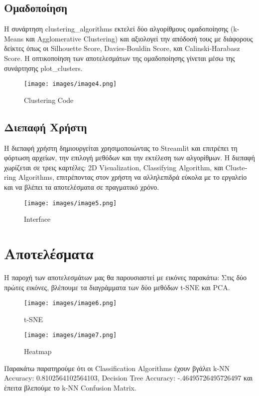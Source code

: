 \documentclass{article}
\begin{document}
\newpage\subsection{Ομαδοποίηση}
Η συνάρτηση \textlatin{clustering\_algorithms} εκτελεί δύο αλγορίθμους ομαδοποίησης (\textlatin{k-Means} και \textlatin{Agglomerative Clustering}) και αξιολογεί την απόδοσή τους με διάφορους δείκτες όπως οι \textlatin{Silhouette Score}, \textlatin{Davies-Bouldin Score}, και \textlatin{Calinski-Harabasz Score}. Η οπτικοποίηση των αποτελεσμάτων της ομαδοποίησης γίνεται μέσω της συνάρτησης \textlatin{plot\_clusters}.
\begin{figure}[h]
   \centering
   \texttt{[image: images/image4.png]}
   \caption{\textlatin{Clustering Code}}
   \label{fig:example}
\end{figure}

\newpage\subsection{Διεπαφή Χρήστη}
Η διεπαφή χρήστη δημιουργείται χρησιμοποιώντας το \textlatin{Streamlit} και επιτρέπει τη φόρτωση αρχείων, την επιλογή μεθόδων και την εκτέλεση των αλγορίθμων. Η διεπαφή χωρίζεται σε τρεις καρτέλες: \textlatin{2D Visualization}, \textlatin{Classifying Algorithm}, και \textlatin{Clustering Algorithms}, επιτρέποντας στον χρήστη να αλληλεπιδρά εύκολα με το εργαλείο και να βλέπει τα αποτελέσματα σε πραγματικό χρόνο.
\begin{figure}[h]
   \centering
   \texttt{[image: images/image5.png]}
   \caption{\textlatin{Interface}}
   \label{fig:example}
\end{figure}

\newpage\section{Αποτελέσματα}
Η παροχή των αποτελεσμάτων μας θα παρουσιαστεί με εικόνες παρακάτω:
Στις δύο πρώτες εικόνες, βλέπουμε τα διαγράμματα των δύο μεθόδων \textlatin{t-SNE} και \textlatin{PCA}.
\begin{figure}[h]
   \centering
   \texttt{[image: images/image6.png]}
   \caption{\textlatin{t-SNE}}
   \label{fig:example}
\end{figure}

\newpage\begin{figure}[h]
   \centering
   \texttt{[image: images/image7.png]}
   \caption{\textlatin{Heatmap}}
   \label{fig:example}
\end{figure}
\newpage
Παρακάτω παρατηρούμε ότι οι \textlatin{Classification Algorithms} έχουν βγάλει \textlatin{k-NN Accuracy}: 0.8102564102564103, \textlatin{Decision Tree Accuracy}: -.46495726495726497 και έπειτα βλεπούμε το \textlatin{k-NN Confusion Matrix}.
\end{document}
